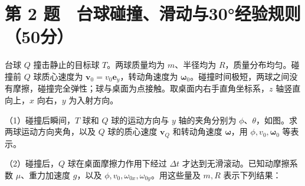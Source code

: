 \documentclass[12pt,a4paper,fontset=fandol]{ctexart}
\begin{document}
\clearpage

\section{第 2
题　台球碰撞、滑动与30°经验规则（50分）}\label{ux7b2c-2-ux9898-ux53f0ux7403ux78b0ux649eux6ed1ux52a8ux4e0e30ux7ecfux9a8cux89c4ux521950ux5206}

台球 \(Q\) 撞击静止的目标球 \(T\)。两球质量均为 \(m\)、半径均为
\(R\)，质量分布均匀。碰撞前 \(Q\) 球质心速度为
\(\boldsymbol v_0=v_0\boldsymbol e_y\)，转动角速度为
\(\boldsymbol\omega_0\)。碰撞时间极短，两球之间没有摩擦，碰撞完全弹性；球与桌面为点接触。取桌面内右手直角坐标系，\(z\)
轴竖直向上，\(x\) 向右，\(y\) 为入射方向。

\begin{center}
\begin{minipage}{\linewidth}
\centering\begingroup
{}
\ifdim\wd\diagrambox>.88\linewidth
\sbox{\diagrambox}{\resizebox{.88\linewidth}{!}{\usebox{\diagrambox}}}
\fi
\ifdim\ht\diagrambox>.40\textheight
\resizebox{!}{.40\textheight}{\usebox{\diagrambox}}
\else\usebox{\diagrambox}\fi
\par{}
\endgroup\end{minipage}
\end{center}

（1）碰撞后瞬间，\(T\) 球和 \(Q\) 球的运动方向与 \(y\) 轴的夹角分别为
\(\phi\)、\(\theta\)，如图。求两球运动方向夹角，以及 \(Q\) 球的质心速度
\(\boldsymbol v_Q\) 和转动角速度 \(\boldsymbol\omega\)，用
\(\phi,v_0,\boldsymbol\omega_0\) 等表示。

（2）碰撞后，\(Q\) 球在桌面摩擦力作用下经过 \(\Delta t\)
才达到无滑滚动。已知动摩擦系数 \(\mu\)、重力加速度 \(g\)，以及
\(\phi,v_0,\omega_{0x},\omega_{0y}\)。用这些量及 \(m,R\) 表示下列结果：
\end{document}
